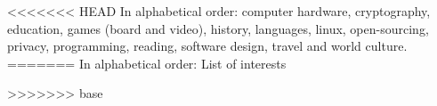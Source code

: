 
\inlineheadsection
<<<<<<< HEAD
{In alphabetical order:}
{computer hardware, cryptography, education, games (board and video), history, languages, linux, open-sourcing, privacy, programming, reading, software design, travel and world culture.\\}
=======
  {In alphabetical order:}
  {List of interests\\}
 
>>>>>>> base
